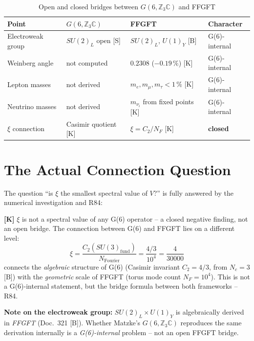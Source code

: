 \begin{table}[h]
\centering
\caption{Open and closed bridges between $G(6,\mathbb{Z}_3\mathbb{C})$ and FFGFT}
\label{tab:offen}
\begin{tabular}{llll}
\toprule
Point & $G(6,\mathbb{Z}_3\mathbb{C})$ & FFGFT & Character \\
\midrule
Electroweak group & $SU(2)_L$ open [S] & $SU(2)_L$, $U(1)_Y$ [B] & G(6)-internal \\
Weinberg angle & not computed & $0.2308$ ($-0.19\,\%$) [K] & G(6)-internal \\
Lepton masses & not derived & $m_e, m_\mu, m_\tau < 1\,\%$ [K] & G(6)-internal \\
Neutrino masses & not derived & $m_{\nu_i}$ from fixed points [K] & G(6)-internal \\
$\xi$ connection & Casimir quotient [K] & $\xi = C_2/N_F$ [K] & \textbf{closed} \\
\bottomrule
\end{tabular}
\end{table}

\section{The Actual Connection Question}

The question ``is $\xi$ the smallest spectral value of $V$?''
is fully answered by the numerical investigation and R84:

\textbf{[K]} $\xi$ is not a spectral value of any G(6) operator --
a closed negative finding, not an open bridge. The connection between
G(6) and FFGFT lies on a different level:
\begin{equation}
  \xi = \frac{C_2(SU(3)_{\text{fund}})}{N_{\text{Fourier}}}
      = \frac{4/3}{10^4} = \frac{4}{30000}
\end{equation}
connects the \emph{algebraic} structure of G(6) (Casimir invariant
$C_2 = 4/3$, from $N_c=3$ [B]) with the \emph{geometric} scale of
FFGFT (torus mode count $N_F = 10^4$). This is not a G(6)-internal
statement, but the bridge formula between both frameworks -- R84.

\textbf{Note on the electroweak group:}
$SU(2)_L\times U(1)_Y$ is algebraically derived in \emph{FFGFT}
(Doc.~321 [B]). Whether Matzke's $G(6,\mathbb{Z}_3\mathbb{C})$
reproduces the same derivation internally is a \emph{G(6)-internal}
problem -- not an open FFGFT bridge.

